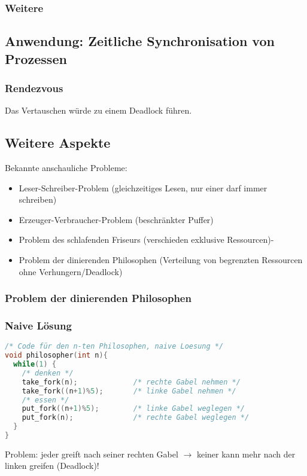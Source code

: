 \subsubsection*{Weitere}

\subsection{Anwendung: Zeitliche Synchronisation von Prozessen}
\subsubsection*{Rendezvous}
Das Vertauschen würde zu einem Deadlock führen.
\subsection{Weitere Aspekte}
Bekannte anschauliche Probleme:
\begin{itemize}
\item Leser-Schreiber-Problem (gleichzeitiges Lesen, nur einer darf immer schreiben)
\item Erzeuger-Verbraucher-Problem (beschränkter Puffer)
\item Problem des schlafenden Friseurs (verschieden exklusive Ressourcen)-
\item Problem der dinierenden Philosophen (Verteilung von begrenzten Ressourcen ohne Verhungern/Deadlock)
\end{itemize}

\subsubsection{Problem der dinierenden Philosophen}
\subsubsection*{Naive Lösung}
\begin{lstlisting}[language=C]
/* Code für den n-ten Philosophen, naive Loesung */
void philosopher(int n){
  while(1) {
    /* denken */
    take_fork(n);             /* rechte Gabel nehmen */
    take_fork((n+1)%5);       /* linke Gabel nehmen */
    /* essen */
    put_fork((n+1)%5);        /* linke Gabel weglegen */
    put_fork(n);              /* rechte Gabel weglegen */
  }
}

\end{lstlisting}
Problem: jeder greift nach seiner rechten Gabel $\to$ keiner kann mehr nach der linken greifen (Deadlock)!

